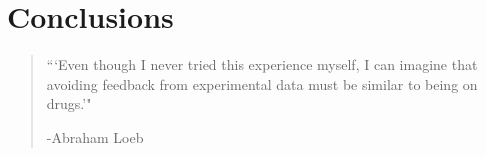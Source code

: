 \chapter{Conclusions}
\label{chap:Conclusions}


\begin{quotation}

\begin{flushright}
\begin{minipage}[t][5cm][b]{0.5\textwidth}
{ ```Even though I never tried this experience myself, I can imagine that avoiding feedback from experimental data must be similar to being on drugs.'"}

\bigskip

-{\small  Abraham Loeb}
\end{minipage}
\end{flushright}

\vspace{0.5cm}
\end{quotation}
